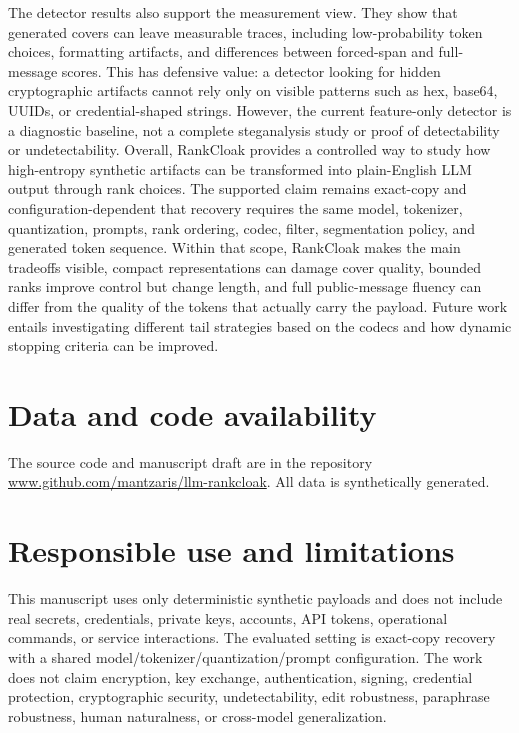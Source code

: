 \documentclass[fleqn,10pt]{wlscirep}
\begin{document}
The detector results also support the measurement view. They show that generated covers can leave measurable traces, including low-probability token choices, formatting artifacts, and differences between forced-span and full-message scores. This has defensive value: a detector looking for hidden cryptographic artifacts cannot rely only on visible patterns such as hex, base64, UUIDs, or credential-shaped strings. However, the current feature-only detector is a diagnostic baseline, not a complete steganalysis study or proof of detectability or undetectability.
Overall, RankCloak provides a controlled way to study how high-entropy synthetic artifacts can be transformed into plain-English LLM output through rank choices. The supported claim remains exact-copy and configuration-dependent that recovery requires the same model, tokenizer, quantization, prompts, rank ordering, codec, filter, segmentation policy, and generated token sequence. Within that scope, RankCloak makes the main tradeoffs visible, compact representations can damage cover quality, bounded ranks improve control but change length, and full public-message fluency can differ from the quality of the tokens that actually carry the payload. Future work entails investigating different tail strategies based on the codecs and how dynamic stopping criteria can be improved.




\section*{Data and code availability}

The source code and manuscript draft are in the repository \url{www.github.com/mantzaris/llm-rankcloak}. All data is synthetically generated.


\section*{Responsible use and limitations}

This manuscript uses only deterministic synthetic payloads and does not include real secrets, credentials, private keys, accounts, API tokens, operational commands, or service interactions. The evaluated setting is exact-copy recovery with a shared model/tokenizer/quantization/prompt configuration. The work does not claim encryption, key exchange, authentication, signing, credential protection, cryptographic security, undetectability, edit robustness, paraphrase robustness, human naturalness, or cross-model generalization.
\end{document}
